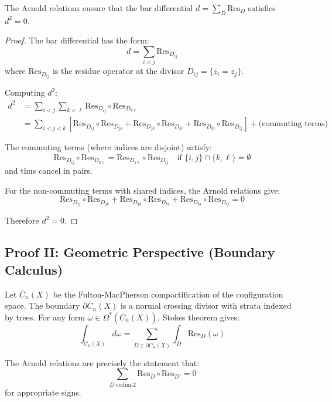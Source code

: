 \begin{corollary}
\label{cor:nilpotency-arnold-comprehensive}
The Arnold relations ensure that the bar differential $d = \sum_{D} \text{Res}_D$ 
satisfies $d^2 = 0$.
\end{corollary}

\begin{proof}
The bar differential has the form:
\begin{equation}
d = \sum_{i < j} \text{Res}_{D_{ij}}
\end{equation}
where $\text{Res}_{D_{ij}}$ is the residue operator at the divisor $D_{ij} = \{z_i = z_j\}$.

Computing $d^2$:
\begin{align}
d^2 &= \sum_{i<j} \sum_{k<\ell} \text{Res}_{D_{ij}} \circ \text{Res}_{D_{k\ell}}\\
&= \sum_{i<j<k} \left[\text{Res}_{D_{ij}} \circ \text{Res}_{D_{jk}} + \text{Res}_{D_{jk}} 
\circ \text{Res}_{D_{ki}} + \text{Res}_{D_{ki}} \circ \text{Res}_{D_{ij}}\right] + 
\text{(commuting terms)}
\end{align}

The commuting terms (where indices are disjoint) satisfy:
\begin{equation}
\text{Res}_{D_{ij}} \circ \text{Res}_{D_{k\ell}} = \text{Res}_{D_{k\ell}} \circ 
\text{Res}_{D_{ij}} \quad \text{if } \{i,j\} \cap \{k,\ell\} = \emptyset
\end{equation}
and thus cancel in pairs.

For the non-commuting terms with shared indices, the Arnold relations give:
\begin{equation}
\text{Res}_{D_{ij}} \circ \text{Res}_{D_{jk}} + \text{Res}_{D_{jk}} \circ \text{Res}_{D_{ki}} 
+ \text{Res}_{D_{ki}} \circ \text{Res}_{D_{ij}} = 0
\end{equation}

Therefore $d^2 = 0$.
\end{proof}

\subsection{Proof II: Geometric Perspective (Boundary Calculus)}
\label{sec:arnold-proof-geometric}

\begin{theorem}
\label{thm:arnold-geometric}
Let $\overline{C}_n(X)$ be the Fulton-MacPherson compactification of the configuration 
space. The boundary $\partial \overline{C}_n(X)$ is a normal crossing divisor with strata 
indexed by trees. For any form $\omega \in \Omega^*(\overline{C}_n(X))$, Stokes theorem 
gives:
\begin{equation}
\int_{\overline{C}_n(X)} d\omega = \sum_{D \in \partial \overline{C}_n(X)} 
\int_D \text{Res}_D(\omega)
\end{equation}

The Arnold relations are precisely the statement that:
\begin{equation}
\sum_{D \text{ codim-2}} \text{Res}_D \circ \text{Res}_{D'} = 0
\end{equation}
for appropriate signs.
\end{theorem}

